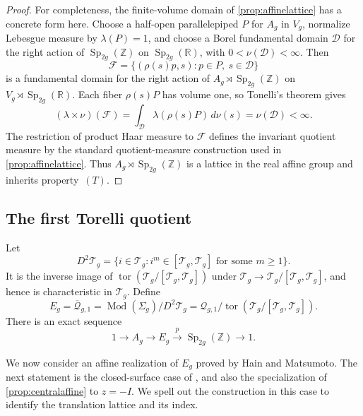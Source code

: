 \documentclass[11pt,a4paper]{article}
\theoremstyle{definition}
\newcommand{\R}{\mathbb R}
\newcommand{\Z}{\mathbb Z}
\newcommand{\Mod}{\operatorname{Mod}}
\newcommand{\Sp}{\operatorname{Sp}}
\newcommand{\tor}{\operatorname{tor}}
\newcommand{\rt}{(T)}
\begin{document}
\begin{proof}
For completeness, the finite-volume domain of
\cref{prop:affinelattice} has a concrete form here. Choose a
half-open parallelepiped \(P\) for \(A_g\) in \(V_g\), normalize
Lebesgue measure by \(\lambda(P)=1\), and choose a Borel
fundamental domain \(\mathcal D\) for the right action of
\(\Sp_{2g}(\Z)\) on \(\Sp_{2g}(\R)\), with
\(0<\nu(\mathcal D)<\infty\).
Then
\[
 \mathcal F=\{(\rho(s)p,s):p\in P,\ s\in\mathcal D\}
\]
is a fundamental domain for the right action of
\(A_g\rtimes\Sp_{2g}(\Z)\) on
\(V_g\rtimes\Sp_{2g}(\R)\). Each fiber
\(\rho(s)P\) has volume one, so Tonelli's theorem gives
\[
 (\lambda\times\nu)(\mathcal F)
 =\int_{\mathcal D}\lambda(\rho(s)P)\,d\nu(s)
 =\nu(\mathcal D)<\infty.
\]
The restriction of product Haar measure to \(\mathcal F\)
defines the invariant quotient measure by the standard
quotient-measure construction used in
\cref{prop:affinelattice}. Thus \(A_g\rtimes\Sp_{2g}(\Z)\) is a
lattice in the real affine group and inherits property~\(\rt\).
\end{proof}

\subsection{The first Torelli quotient}

Let
\[
 D^2\mathcal{T}_g=\{i\in\mathcal{T}_g:i^m\in[\mathcal{T}_g,\mathcal{T}_g]
                              \text{ for some }m\ge1\}.
\]
It is the inverse image of \(\tor(\mathcal{T}_g/[\mathcal{T}_g,\mathcal{T}_g])\) under \(\mathcal{T}_g\to\mathcal{T}_g/[\mathcal{T}_g,\mathcal{T}_g]\),
and hence is characteristic in \(\mathcal{T}_g\). Define
\[
 E_g=\overline{\mathcal{Q}}_{g,1}=\Mod(\Sigma_g)/D^2\mathcal{T}_g=\mathcal{Q}_{g,1}/\tor(\mathcal{T}_g/[\mathcal{T}_g,\mathcal{T}_g]).
\]
There is an exact sequence
\begin{equation}\label{eq:torsionfreeabelianextension}
 1\longrightarrow A_g\longrightarrow E_g
 \xrightarrow{p}\Sp_{2g}(\Z)\longrightarrow1.
\end{equation}


We now consider an affine realization of \(E_g\) proved by Hain and Matsumoto.
The next statement is the closed-surface case of
\cite[Lemma~6.3]{HainMatsumoto}, and also the specialization of
\cref{prop:centralaffine} to \(z=-I\). We spell out the construction
in this case to identify the translation lattice and its index.
\end{document}
